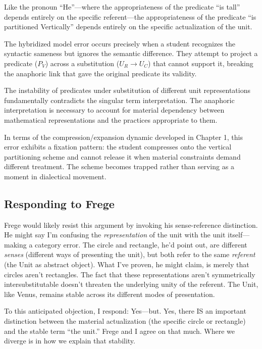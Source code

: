 \documentclass[12pt]{book}
\begin{document}
Like the pronoun ``He''---where the appropriateness of the predicate ``is tall'' depends entirely on the specific referent---the appropriateness of the predicate ``is partitioned Vertically'' depends entirely on the specific actualization of the unit.

The hybridized model error occurs precisely when a student recognizes the syntactic sameness but ignores the semantic difference. They attempt to project a predicate (\(P_V\)) across a substitution (\(U_R \rightarrow U_C\)) that cannot support it, breaking the anaphoric link that gave the original predicate its validity.

The instability of predicates under substitution of different unit representations fundamentally contradicts the singular term interpretation. The anaphoric interpretation is necessary to account for material dependency between mathematical representations and the practices appropriate to them.

In terms of the compression/expansion dynamic developed in Chapter 1, this error exhibits a fixation pattern: the student compresses onto the vertical partitioning scheme and cannot release it when material constraints demand different treatment. The scheme becomes trapped rather than serving as a moment in dialectical movement.

\subsection*{Responding to Frege}\label{responding-to-frege}

Frege would likely resist this argument by invoking his sense-reference distinction. He might say I'm confusing the \emph{representation} of the unit with the unit itself---making a category error. The circle and rectangle, he'd point out, are different \emph{senses} (different ways of presenting the unit), but both refer to the same \emph{referent} (the Unit as abstract object). What I've proven, he might claim, is merely that circles aren't rectangles. The fact that these representations aren't symmetrically intersubstitutable doesn't threaten the underlying unity of the referent. The Unit, like Venus, remains stable across its different modes of presentation.

To this anticipated objection, I respond: Yes---but. Yes, there IS an important distinction between the material actualization (the specific circle or rectangle) and the stable term ``the unit.'' Frege and I agree on that much. Where we diverge is in how we explain that stability.
\end{document}
